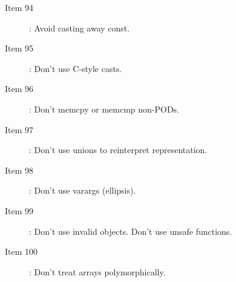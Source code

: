 \begin{description}
\begin{description}
  {}\item[Item 94]: Avoid casting away const.

  {}\item[Item 95]: Don't use C-style casts.

  {}\item[Item 96]: Don't memcpy or memcmp non-PODs.

  {}\item[Item 97]: Don't use unions to reinterpret representation.

  {}\item[Item 98]: Don't use varargs (ellipsis).

  {}\item[Item 99]: Don't use invalid objects. Don't use unsafe functions.

  {}\item[Item 100]: Don't treat arrays polymorphically.

  \end{description}

\end{description}

